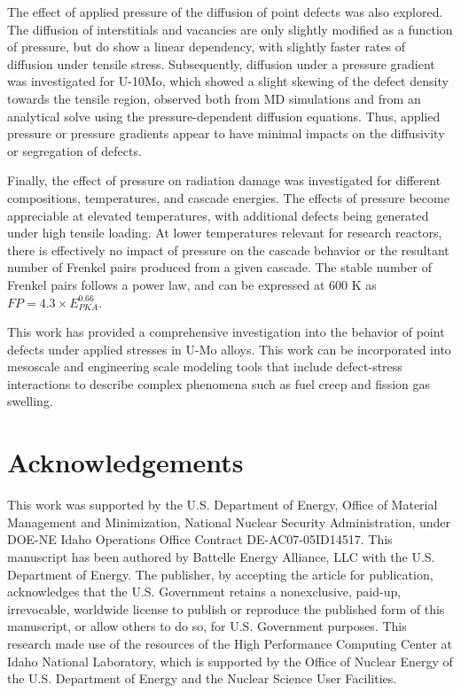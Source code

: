 \documentclass[review]{elsarticle}
\begin{document}
The effect of applied pressure of the diffusion of point defects was also explored. The diffusion of interstitials and vacancies are only slightly modified as a function of pressure, but do show a linear dependency, with slightly faster rates of diffusion under tensile stress. Subsequently, diffusion under a pressure gradient was investigated for U-10Mo, which showed a slight skewing of the defect density towards the tensile region, observed both from MD simulations and from an analytical solve using the pressure-dependent diffusion equations. Thus, applied pressure or pressure gradients appear to have minimal impacts on the diffusivity or segregation of defects. 

Finally, the effect of pressure on radiation damage was investigated for different compositions, temperatures, and cascade energies. The effects of pressure become appreciable at elevated temperatures, with additional defects being generated under high tensile loading. At lower temperatures relevant for research reactors, there is effectively no impact of pressure on the cascade behavior or the resultant number of Frenkel pairs produced from a given cascade. The stable number of Frenkel pairs follows a power law, and can be expressed at 600 K as $FP = 4.3 \times E_{PKA}^{0.66}$. 

This work has provided a comprehensive investigation into the behavior of point defects under applied stresses in U-Mo alloys. This work can be incorporated into mesoscale and engineering scale modeling tools that include defect-stress interactions to describe complex phenomena such as fuel creep and fission gas swelling. 


\section{Acknowledgements}\label{sec5}
This work was supported by the U.S. Department of Energy, Office of Material Management and Minimization, National Nuclear Security Administration, under DOE-NE Idaho Operations Office Contract DE-AC07-05ID14517. This manuscript has been authored by Battelle Energy Alliance, LLC with the U.S. Department of Energy. The publisher, by accepting the article for publication, acknowledges that the U.S. Government retains a nonexclusive, paid-up, irrevocable, worldwide license to publish or reproduce the published form of this manuscript, or allow others to do so, for U.S. Government purposes. This research made use of the resources of the High Performance Computing Center at Idaho National Laboratory, which is supported by the Office of Nuclear Energy of the U.S. Department of Energy and the Nuclear Science User Facilities.
\end{document}

